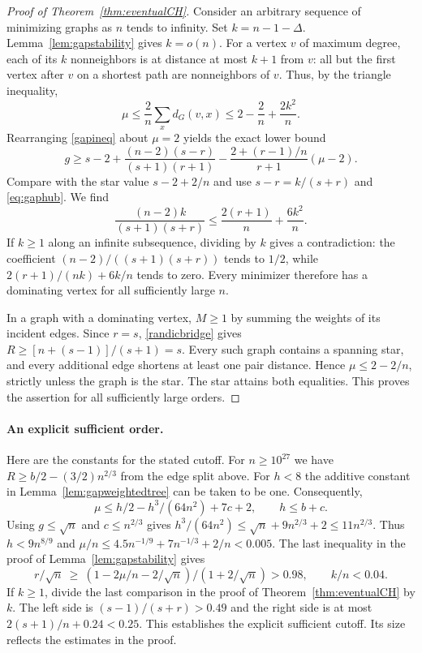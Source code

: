 \documentclass[11pt,a4paper]{article}
\theoremstyle{remark}\newtheorem*{remark}{Remark}
\begin{document}
\begin{proof}[Proof of Theorem~\ref{thm:eventualCH}]
Consider an arbitrary sequence of minimizing graphs as $n$ tends to infinity.
Set $k=n-1-\Delta$. Lemma~\ref{lem:gapstability} gives $k=o(n)$.
For a vertex $v$ of maximum degree, each of its $k$ nonneighbors is at
distance at most $k+1$ from $v$: all but the first vertex after $v$ on a
shortest path are nonneighbors of $v$. Thus, by the triangle inequality,
\begin{equation}\label{eq:gaphub}
 \mu\le\frac2n\sum_x d_G(v,x)
       \le 2-\frac2n+\frac{2k^2}{n}.
\end{equation}
Rearranging \eqref{gapineq} about $\mu=2$ yields the exact lower bound
\[
 g\ge s-2+\frac{(n-2)(s-r)}{(s+1)(r+1)}
       -\frac{2+(r-1)/n}{r+1}(\mu-2).
\]
Compare with the star value $s-2+2/n$ and use $s-r=k/(s+r)$ and
\eqref{eq:gaphub}. We find
\[
 \frac{(n-2)k}{(s+1)(s+r)}
       \le\frac{2(r+1)}{n}+\frac{6k^2}{n}.
\]
If $k\ge1$ along an infinite subsequence, dividing by $k$ gives a
contradiction: the coefficient $(n-2)/((s+1)(s+r))$ tends to $1/2$,
while $2(r+1)/(nk)+6k/n$ tends to zero. Every minimizer therefore has a
dominating vertex for all sufficiently large $n$.

In a graph with a dominating vertex, $M\ge1$ by summing the weights of its
incident edges. Since $r=s$, \eqref{randicbridge} gives
$R\ge[n+(s-1)]/(s+1)=s$. Every such graph contains a spanning star,
and every additional edge shortens at least one pair distance. Hence
$\mu\le 2-2/n$, strictly unless the graph is the star. The star attains
both equalities. This proves the assertion for all sufficiently large
orders.
\end{proof}

\paragraph{An explicit sufficient order.}
Here are the constants for the stated cutoff. For $n\ge10^{27}$ we have $R\ge b/2-(3/2)n^{2/3}$ from the edge split above. For $h<8$ the additive constant in Lemma~\ref{lem:gapweightedtree} can be taken to be one. Consequently,
\[
 \mu\le h/2-h^3/(64n^2)+7c+2,\qquad h\le b+c.
\]
Using $g\le\sqrt n$ and $c\le n^{2/3}$ gives
$h^3/(64n^2)\le\sqrt n+9n^{2/3}+2\le11n^{2/3}$.
Thus $h<9n^{8/9}$ and $\mu/n\le4.5n^{-1/9}+7n^{-1/3}+2/n<0.005$.
The last inequality in the proof of Lemma~\ref{lem:gapstability} gives
\[
 r/\sqrt n\ \ge\ (1-2\mu/n-2/\sqrt n)/(1+2/\sqrt n)>0.98,
 \qquad k/n<0.04 .
\]
If $k\ge1$, divide the last comparison in the proof of Theorem~\ref{thm:eventualCH} by $k$. The left side is $(s-1)/(s+r)>0.49$ and the right side is at most $2(s+1)/n+0.24<0.25$. This establishes the explicit sufficient cutoff. Its size reflects the estimates in the proof.
\end{document}
